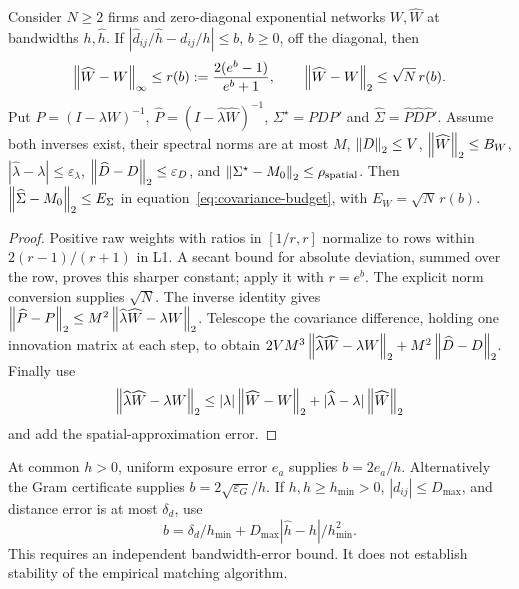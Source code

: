 \documentclass[11pt]{article}
\renewcommand{\lean}[1]{\ignorespaces}
\renewcommand{\leanok}{\ignorespaces}
\begin{document}
\begin{proposition}\label{prop:stability}
  \lean{FreeFoundations.Kernel.expKernel_row_l1_le_scaled,
    FreeFoundations.EndToEnd.kernel_spectral_scaled,
  FreeFoundations.Stability.matrix_covariance_target_sub_le}\leanok{}
  Consider $N\ge2$ firms and zero-diagonal exponential networks $W,\widehat W$
  at bandwidths $h,\widehat h$. If
  $|\widehat d_{ij}/\widehat h-d_{ij}/h|\le b$, $b\ge0$, off the diagonal, then
  \[
    \left\lVert\widehat W-W\right\rVert_\infty\le r(b):=
    \frac{2(e^b-1)}{e^b+1},\qquad
    \left\lVert\widehat W-W\right\rVert_2\le\sqrt N\,r(b).
  \]
  Put $P={(I-\lambda W)}^{-1}$,
  $\widehat P={(I-\widehat\lambda\widehat W)}^{-1}$,
  $\Sigma^\star=PDP'$ and $\widehat\Sigma=\widehat P\widehat D\widehat P'$.
  Assume both inverses exist, their spectral norms are at most $M$,
  $\left\lVert D\right\rVert_2\le V$, $\left\lVert\widehat W\right\rVert_2\le B_W$,
  $|\widehat\lambda-\lambda|\le\varepsilon_\lambda$,
  $\left\lVert\widehat D-D\right\rVert_2\le\varepsilon_D$, and
  $\left\lVert\Sigma^\star-M_0\right\rVert_2\le\rho_{\rm spatial}$.
  Then $\left\lVert\widehat\Sigma-M_0\right\rVert_2\le E_\Sigma$ in
  equation~\eqref{eq:covariance-budget}, with $E_W=\sqrt N\,r(b)$.
\end{proposition}
\begin{proof}
  Positive raw weights with ratios in $[1/r,r]$ normalize to rows within
  $2(r-1)/(r+1)$ in L1. A secant bound for absolute deviation, summed over the
  row, proves this sharper constant; apply it with $r=e^b$.
  The explicit norm conversion supplies $\sqrt N$.
  The inverse identity gives
  $\left\lVert\widehat P-P\right\rVert_2\le M^2
  \left\lVert\widehat\lambda\widehat W-\lambda W\right\rVert_2$.
  Telescope the covariance difference, holding one innovation matrix at each
  step, to obtain
  $2VM^3\left\lVert\widehat\lambda\widehat W-\lambda W\right\rVert_2+
  M^2\left\lVert\widehat D-D\right\rVert_2$. Finally use
  \[
    \left\lVert\widehat\lambda\widehat W-\lambda W\right\rVert_2
    \le |\lambda|\left\lVert\widehat W-W\right\rVert_2+
    |\widehat\lambda-\lambda|\left\lVert\widehat W\right\rVert_2
  \]
  and add the spatial-approximation error.
\end{proof}
At common $h>0$, uniform exposure error $e_a$ supplies $b=2e_a/h$.
Alternatively the Gram certificate supplies $b=2\sqrt{\varepsilon_G}/h$.
If $h,\widehat h\ge h_{\min}>0$, $|d_{ij}|\le D_{\max}$, and distance error is
at most $\delta_d$, use
\[
  b=\delta_d/h_{\min}
  +D_{\max}|\widehat h-h|/h_{\min}^2.
\]
\lean{FreeFoundations.EndToEnd.exposure_scaled,
  FreeFoundations.EndToEnd.gram_scaled,
FreeFoundations.Kernel.scaled_distance_error}\leanok{}
This requires an independent bandwidth-error bound. It does not establish
stability of the empirical matching algorithm.
\end{document}
